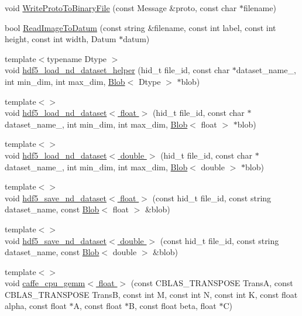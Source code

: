 \begin{DoxyCompactItemize}
void \hyperlink{namespacecaffe_a6e669ab7a89a744359cbb041021b6332}{Write\+Proto\+To\+Binary\+File} (const Message \&proto, const char $\ast$filename)
\item 
bool \hyperlink{namespacecaffe_a8ff5217644f29055cdd8ded8d967af28}{Read\+Image\+To\+Datum} (const string \&filename, const int label, const int height, const int width, Datum $\ast$datum)
\item 
{\footnotesize template$<$typename Dtype $>$ }\\void \hyperlink{namespacecaffe_a5243a4244e34275539dc9c9406f56ecb}{hdf5\+\_\+load\+\_\+nd\+\_\+dataset\+\_\+helper} (hid\+\_\+t file\+\_\+id, const char $\ast$dataset\+\_\+name\+\_\+, int min\+\_\+dim, int max\+\_\+dim, \hyperlink{classcaffe_1_1_blob}{Blob}$<$ Dtype $>$ $\ast$blob)
\item 
{\footnotesize template$<$$>$ }\\void \hyperlink{namespacecaffe_a346345cb5abedfb53722bf09788e409a}{hdf5\+\_\+load\+\_\+nd\+\_\+dataset$<$ float $>$} (hid\+\_\+t file\+\_\+id, const char $\ast$dataset\+\_\+name\+\_\+, int min\+\_\+dim, int max\+\_\+dim, \hyperlink{classcaffe_1_1_blob}{Blob}$<$ float $>$ $\ast$blob)
\item 
{\footnotesize template$<$$>$ }\\void \hyperlink{namespacecaffe_aa62f496e422afc011f5099b6803ba2be}{hdf5\+\_\+load\+\_\+nd\+\_\+dataset$<$ double $>$} (hid\+\_\+t file\+\_\+id, const char $\ast$dataset\+\_\+name\+\_\+, int min\+\_\+dim, int max\+\_\+dim, \hyperlink{classcaffe_1_1_blob}{Blob}$<$ double $>$ $\ast$blob)
\item 
{\footnotesize template$<$$>$ }\\void \hyperlink{namespacecaffe_a4daac61a433f149cddc1bae7161c997e}{hdf5\+\_\+save\+\_\+nd\+\_\+dataset$<$ float $>$} (const hid\+\_\+t file\+\_\+id, const string dataset\+\_\+name, const \hyperlink{classcaffe_1_1_blob}{Blob}$<$ float $>$ \&blob)
\item 
{\footnotesize template$<$$>$ }\\void \hyperlink{namespacecaffe_a4f7735a106e7be1d845b7e7fd0448be9}{hdf5\+\_\+save\+\_\+nd\+\_\+dataset$<$ double $>$} (const hid\+\_\+t file\+\_\+id, const string dataset\+\_\+name, const \hyperlink{classcaffe_1_1_blob}{Blob}$<$ double $>$ \&blob)
\item 
{\footnotesize template$<$$>$ }\\void \hyperlink{namespacecaffe_af2b584d464ec95b349ba159204d58ba7}{caffe\+\_\+cpu\+\_\+gemm$<$ float $>$} (const C\+B\+L\+A\+S\+\_\+\+T\+R\+A\+N\+S\+P\+O\+S\+E Trans\+A, const C\+B\+L\+A\+S\+\_\+\+T\+R\+A\+N\+S\+P\+O\+S\+E Trans\+B, const int M, const int N, const int K, const float alpha, const float $\ast$A, const float $\ast$B, const float beta, float $\ast$C)

\end{DoxyCompactItemize}
